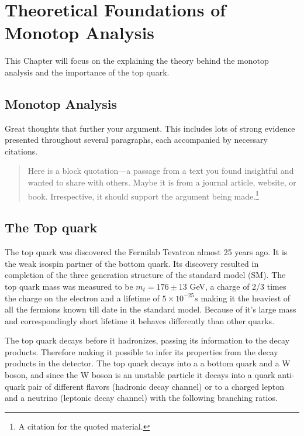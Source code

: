 \chapter{Theoretical Foundations of Monotop Analysis}
\label{chapter:four}
This Chapter will focus on the explaining the theory behind the monotop analysis and the importance of the top quark.
\section{Monotop Analysis}

Great thoughts that further your argument. This includes lots of strong evidence presented throughout several paragraphs, each accompanied by necessary citations.
\begin{quotation}
    \noindent Here is a block quotation---a passage from a text you found insightful and wanted to share with others. Maybe it is from a journal article, website, or book. Irrespective, it should support the argument being made.\footnote{A citation for the quoted material.}
\end{quotation}



\section{The Top quark}

The top quark was discovered the Fermilab Tevatron almost 25 years ago. It is the weak isospin partner of the bottom quark. Its discovery resulted in completion of the three generation structure of the standard model (SM). The top quark mass was measured to be $m_{t} = 176 \pm 13$ GeV, a charge of 2/3 times the charge on the electron and a lifetime of $5 \times 10^{-25} s$ making it the heaviest of all the fermions known till date in the standard model. Because of it's large mass and correspondingly short lifetime it behaves differently than other quarks. 

The top quark decays before it hadronizes, passing its information to the decay products. Therefore making it possible to infer its properties from the decay products in the detector. The top quark decays into a a bottom quark and a W boson, and since the W boson is an unstable particle it decays into a quark anti-quark pair of different flavors (hadronic decay channel) or to a charged lepton and a neutrino (leptonic decay channel) with the following branching ratios.

